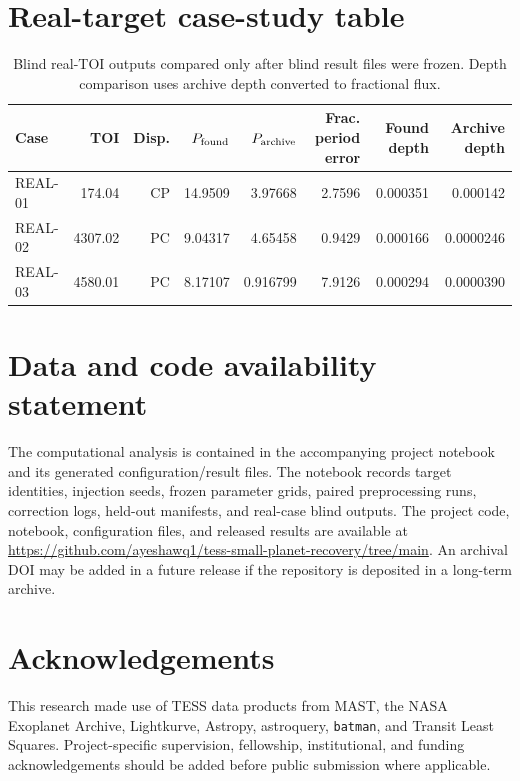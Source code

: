 \documentclass[11pt]{article}
\begin{document}
\section{Real-target case-study table}
\begin{table}[htbp]
\centering
\caption{Blind real-TOI outputs compared only after blind result files were frozen. Depth comparison uses archive depth converted to fractional flux.}
\small
\begin{tabular}{lrrrrrrr}
\toprule
Case & TOI & Disp. & $P_{\rm found}$ & $P_{\rm archive}$ & Frac. period error & Found depth & Archive depth\\
\midrule
REAL-01 & 174.04  & CP & 14.9509 & 3.97668 & 2.7596 & 0.000351 & 0.000142\\
REAL-02 & 4307.02 & PC & 9.04317 & 4.65458 & 0.9429 & 0.000166 & 0.0000246\\
REAL-03 & 4580.01 & PC & 8.17107 & 0.916799 & 7.9126 & 0.000294 & 0.0000390\\
\bottomrule
\end{tabular}
\end{table}

\section{Data and code availability statement}
The computational analysis is contained in the accompanying project notebook and its generated configuration/result files. The notebook records target identities, injection seeds, frozen parameter grids, paired preprocessing runs, correction logs, held-out manifests, and real-case blind outputs. The project code, notebook, configuration files, and released results are available at \url{https://github.com/ayeshawq1/tess-small-planet-recovery/tree/main}. An archival DOI may be added in a future release if the repository is deposited in a long-term archive.

\section*{Acknowledgements}
This research made use of TESS data products from MAST, the NASA Exoplanet Archive, Lightkurve, Astropy, astroquery, \texttt{batman}, and Transit Least Squares. Project-specific supervision, fellowship, institutional, and funding acknowledgements should be added before public submission where applicable.
\end{document}
